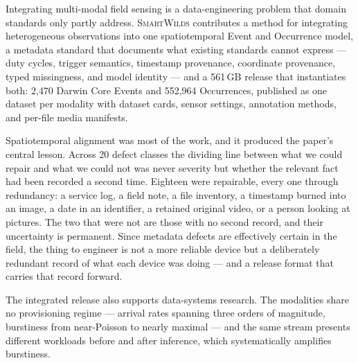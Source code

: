 \documentclass[sigconf]{acmart}
\newcommand{\smartwilds}{\textsc{SmartWilds}\xspace}
\begin{document}
Integrating multi-modal field sensing is a data-engineering problem
that domain standards only partly address. \smartwilds contributes a
method for integrating heterogeneous observations into one
spatiotemporal Event and Occurrence model, a metadata standard that
documents what existing standards cannot express --- duty cycles,
trigger semantics, timestamp provenance, coordinate provenance, typed
missingness, and model identity --- and a 561\,GB release that
instantiates both: 2{,}470 Darwin Core Events and 552{,}964 Occurrences,
published as one dataset per modality with dataset cards, sensor
settings, annotation methods, and per-file media manifests.

Spatiotemporal alignment was most of the work, and it produced the
paper's central lesson. Across 20 defect classes the dividing line
between what we could repair and what we could not was never severity
but whether the relevant fact had been recorded a second time. Eighteen
were repairable, every one through redundancy: a service log, a field
note, a file inventory, a timestamp burned into an image, a date in an
identifier, a retained original video, or a person looking at pictures.
The two that were not are those with no second record, and their
uncertainty is permanent. Since metadata defects are effectively
certain in the field, the thing to engineer is not a more reliable
device but a deliberately redundant record of what each device was
doing --- and a release format that carries that record forward.

The integrated release also supports data-systems research. The
modalities share no provisioning regime --- arrival rates spanning three
orders of magnitude, burstiness from near-Poisson to nearly maximal ---
and the same stream presents different workloads before and after
inference, which systematically amplifies burstiness.
\end{document}

